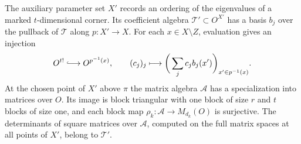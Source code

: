 \begin{established}\label{hyp:theta-marked-corner}
The auxiliary parameter set \(X'\) records an ordering of
the eigenvalues of a marked \(t\)-dimensional corner. Its
coefficient algebra \(\mathcal T'\subset O^{X'}\) has a
basis \(b_j\) over the pullback of \(\mathcal T\) along
\(p:X'\to X\). For each \(x\in X\setminus Z\), evaluation gives an injection
\[
 O^{t!}\lhook\joinrel\longrightarrow O^{p^{-1}(x)},\qquad
 (c_j)_j\longmapsto\bigg(\sum_j c_j b_j(x')\bigg)_{x'\in p^{-1}(x)} .
\] At the chosen
point of \(X'\) above \(\pi\) the matrix algebra
\(\mathcal A\) has a specialization into matrices over
\(O\). Its image is block triangular with one block of
size \(r\) and \(t\) blocks of size one, and each block
map \(\rho_k:\mathcal A\to M_{d_k}(O)\) is surjective.
The determinants of square matrices over \(\mathcal A\),
computed on the full matrix spaces at all points of
\(X'\), belong to \(\mathcal T'\).
\end{established}
